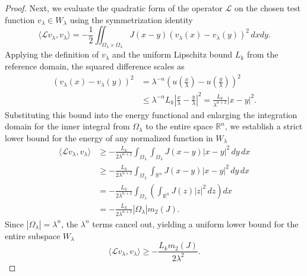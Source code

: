 \documentclass[12pt, a4paper]{article}
\theoremstyle{break}
\theoremstyle{break}
\theoremstyle{break}
\theoremstyle{break}
\theoremstyle{break}
\theoremstyle{break}
\theoremstyle{break}
\theoremstyle{break}
\theoremstyle{break}
\begin{document}
\begin{proof}
    Next, we evaluate the quadratic form of the operator $\mathcal{L}$ on the chosen test function $v_\lambda \in W_\lambda$ using the symmetrization identity
    \begin{equation}
        \langle \mathcal{L}v_\lambda, v_\lambda \rangle = -\frac{1}{2} \iint_{\Omega_\lambda \times \Omega_\lambda} J(x-y) (v_\lambda(x) - v_\lambda(y))^2 \, dx dy.
    \end{equation}
    Applying the definition of $v_\lambda$ and the uniform Lipschitz bound $L_k$ from the reference domain, the squared difference scales as
    \begin{align} \label{eq:lipschitz_scaling}
        (v_\lambda(x) - v_\lambda(y))^2 &= \lambda^{-n} \left( u\left(\frac{x}{\lambda}\right) - u\left(\frac{y}{\lambda}\right) \right)^2 \nonumber \\
        &\leq \lambda^{-n} L_k \left| \frac{x}{\lambda} - \frac{y}{\lambda} \right|^2 = \frac{L_k}{\lambda^{n+2}} |x-y|^2.
    \end{align}
    Substituting this bound into the energy functional and enlarging the integration domain for the inner integral from $\Omega_\lambda$ to the entire space $\mathbb{R}^n$, we establish a strict lower bound for the energy of any normalized function in $W_\lambda$
    \begin{align} \label{eq:energy_scaling_bound_k}
        \langle \mathcal{L}v_\lambda, v_\lambda \rangle &\geq -\frac{L_k}{2 \lambda^{n+2}} \int_{\Omega_\lambda} \int_{\Omega_\lambda} J(x-y) |x-y|^2 \, dy \, dx \nonumber \\
        &\geq -\frac{L_k}{2 \lambda^{n+2}} \int_{\Omega_\lambda} \int_{\mathbb{R}^n} J(x-y) |x-y|^2 \, dy \, dx \nonumber \\
        &= -\frac{L_k}{2 \lambda^{n+2}} \int_{\Omega_\lambda} \left( \int_{\mathbb{R}^n} J(z) |z|^2 \, dz \right) dx \nonumber \\
        &= -\frac{L_k}{2 \lambda^{n+2}} |\Omega_\lambda| m_2(J).
    \end{align}
    Since $|\Omega_\lambda| = \lambda^n$, the $\lambda^n$ terms cancel out, yielding a uniform lower bound for the entire subspace $W_\lambda$
    \begin{equation}
        \langle \mathcal{L}v_\lambda, v_\lambda \rangle \geq -\frac{L_k m_2(J)}{2 \lambda^2}.
    \end{equation}


\end{proof}
\end{document}
